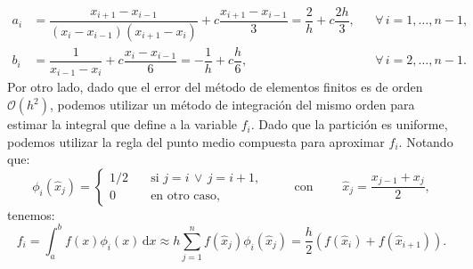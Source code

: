 \documentclass[letterpaper,11pt]{article}
\begin{document}
\begin{align*}
a_i{}&=\dfrac{x_{i+1}-x_{i-1}}{(x_{i}-x_{i-1})(x_{i+1}-x_{i})}+c\dfrac{x_{i+1}-x_{i-1}}{3}=\dfrac{2}{h}+c\dfrac{2h}{3},&&\forall\,i=1,\ldots,n-1,\\
b_i{}&=\dfrac{1}{x_{i-1}-x_{i}}+c\dfrac{x_{i}-x_{i-1}}{6}=-\dfrac{1}{h}+c\dfrac{h}{6},&&\forall\,i=2,\ldots,n-1.
\end{align*}
Por otro lado, dado que el error del m\'etodo de elementos finitos es de orden $\mathcal{O}(h^2)$, podemos utilizar un m\'etodo de integraci\'on del mismo orden para estimar la integral que define a la variable $f_i$. Dado que la partici\'on es uniforme, podemos utilizar la regla del punto medio compuesta para aproximar $f_i$. Notando que:
$$
\phi_i(\hat{x}_j)=
\begin{cases}
1/2 &\quad \text{si } j=i\, \vee\, j=i+1,\\
0 & \quad \text{en otro caso,}
\end{cases}
\qquad \text{ con }\qquad \hat{x}_j=\dfrac{x_{j-1}+x_{j}}{2},
$$
tenemos:
$$
f_i=\int_a^b f(x)\phi_i(x)\,\mathrm{d}x\approx h\sum_{j=1}^n f(\hat{x}_j)\phi_i(\hat{x}_j) = \dfrac{h}{2}\left(f(\hat{x}_i)+f(\hat{x}_{i+1})\right).
$$
\end{document}

